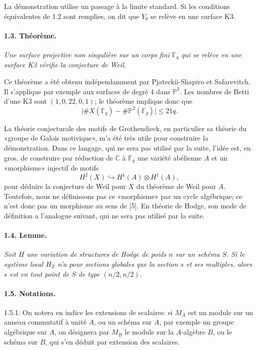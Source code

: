 \documentclass[10pt]{article}
\newcommand{\C}{\mathbb{C}}
\newcommand{\Z}{\mathbb{Z}}
\newcommand{\Fp}{\mathbb{F}_q}
\newcommand{\into}{\hookrightarrow}
\begin{document}
La démonstration utilise un passage à la limite standard. Si les conditions équivalentes de 1.2 sont remplies, on dit que $Y_0$ se relève en une surface K3.

\paragraph{1.3. Théorème.} \emph{Une surface projective non singulière sur un corps fini $\Fp$ qui se relève en une surface K3 vérifie la conjecture de Weil.}

Ce théorème a été obtenu indépendamment par Pjateckii-Shapiro et Safarevitch. Il s'applique par exemple aux surfaces de degré $4$ dans $\mathbb P^3$. Les nombres de Betti d'une K3 sont $(1,0,22,0,1)$; le théorème implique donc que
\[
\bigl|\#X(\Fp)-\#\mathbb P^2(\Fp)\bigr|\le21q.
\]

La théorie conjecturale des motifs de Grothendieck, en particulier sa théorie du «groupe de Galois motivique», m'a été très utile pour construire la démonstration. Dans ce langage, qui ne sera pas utilisé par la suite, l'idée est, en gros, de construire par réduction de $\C$ à $\Fp$ une variété abélienne $A$ et un «morphisme» injectif de motifs
\[
H^2(X)\into H^1(A)\otimes H^1(A),
\]
pour déduire la conjecture de Weil pour $X$ du théorème de Weil pour $A$. Toutefois, nous ne définissons pas ce «morphisme» par un cycle algébrique; ce n'est donc pas un morphisme au sens de [5]. En théorie de Hodge, son mode de définition a l'analogue suivant, qui ne sera pas utilisé par la suite.

\paragraph{1.4. Lemme.} \emph{Soit $H$ une variation de structures de Hodge de poids $n$ sur un schéma $S$. Si le système local $H_\Z$ n'a pour sections globales que la section $s$ et ses multiples, alors $s$ est en tout point de $S$ de type $(n/2,n/2)$.}

\paragraph{1.5. Notations.} 1.5.1. On notera en indice les extensions de scalaires: si $M_A$ est un module sur un anneau commutatif à unité $A$, ou un schéma sur $A$, par exemple un groupe algébrique sur $A$, on désignera par $M_B$ le module sur la $A$-algèbre $B$, ou le schéma sur $B$, qui s'en déduit par extension des scalaires.
\end{document}
